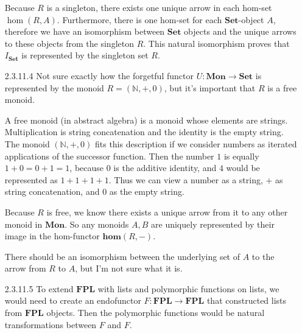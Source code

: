 \documentclass{article}
\newcommand{\cmon}{\mathbf{Mon}}
\newcommand{\cset}{\mathbf{Set}}
\newcommand{\fhom}{\mathbf{hom}}
\newcommand{\fpl}{\mathbf{FPL}}
\newcommand{\nat}{\mathbb{N}}
\begin{document}
\begin{enumerate}
\begin{center}
  \end{center}
  
  Because $R$ is a singleton, there exists one unique arrow in each hom-set $\hom(R,A)$.
  Furthermore, there is one hom-set for each $\cset$-object $A$, therefore we have an isomorphism between $\cset$ objects and the unique arrows to these objects from the singleton $R$.
  This natural isomorphism proves that $I_\cset$ is represented by the singleton set $R$.

\newpage
\item [2.3.11.4]
  Not sure exactly how the forgetful functor $U : \cmon \rightarrow \cset$ is represented by the monoid $R = (\nat,+,0)$, but it's important that $R$ is a free monoid.
  
  A free monoid (in abstract algebra) is a monoid whose elements are strings.
  Multiplication is string concatenation and the identity is the empty string.
  The monoid $(\nat, +, 0)$ fits this description if we consider numbers as iterated applications of the successor function.
  Then the number $1$ is equally $1 + 0 = 0 + 1 = 1$, because $0$ is the additive identity, and $4$ would be represented as $1 + 1 + 1 + 1$.
  Thus we can view a number as a string, $+$ as string concatenation, and $0$ as the empty string.

  Because $R$ is free, we know there exists a unique arrow from it to any other monoid in $\cmon$.
  So any monoids $A,B$ are uniquely represented by their image in the hom-functor $\fhom(R,-)$.
  
  There should be an isomorphism between the underlying set of $A$ to the arrow from $R$ to $A$, but I'm not sure what it is.
  
\item[]
\item [2.3.11.5] To extend $\fpl$ with lists and polymorphic functions on lists, we would need to create an endofunctor $F : \fpl \rightarrow \fpl$ that constructed lists from $\fpl$ objects.
  Then the polymorphic functions would be natural transformations between $F$ and $F$.

\end{enumerate}
\end{document}
